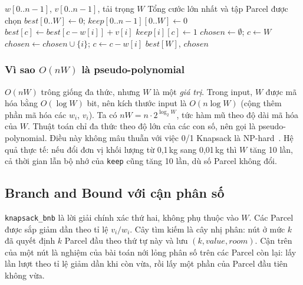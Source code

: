 \begin{algorithm}[t]
\caption{0/1 Knapsack bằng DP một chiều (\texttt{knapsack\_dp})}\label{alg:knap}
\begin{algorithmic}[1]
\Require $w[0..n-1]$, $v[0..n-1]$, tải trọng $W$
\Ensure Tổng cước lớn nhất và tập Parcel được chọn
\State $best[0..W] \gets 0$; \quad $keep[0..n-1][0..W] \gets 0$
      \State $best[c] \gets best[c - w[i]] + v[i]$
      \State $keep[i][c] \gets 1$
    \EndIf
  \EndFor
\EndFor
\State $chosen \gets \emptyset$; \quad $c \gets W$
    \State $chosen \gets chosen \cup \{i\}$; \quad $c \gets c - w[i]$
  \EndIf
\EndFor
\State \Return $best[W]$, $chosen$
\end{algorithmic}
\end{algorithm}

\subsubsection{Vì sao $O(nW)$ là pseudo-polynomial}
$O(nW)$ trông giống đa thức, nhưng $W$ là một \emph{giá trị}. Trong input, $W$ được mã hóa bằng $O(\log W)$ bit, nên kích thước input là $O(n \log W)$ (cộng thêm phần mã hóa các $w_i$, $v_i$). Ta có $nW = n \cdot 2^{\log_2 W}$, tức hàm mũ theo độ dài mã hóa của $W$. Thuật toán chỉ đa thức theo độ lớn của các con số, nên gọi là pseudo-polynomial. Điều này không mâu thuẫn với việc 0/1 Knapsack là NP-hard~\cite{clrs2022}. Hệ quả thực tế: nếu đổi đơn vị khối lượng từ 0,1\,kg sang 0,01\,kg thì $W$ tăng 10 lần, cả thời gian lẫn bộ nhớ của \texttt{keep} cũng tăng 10 lần, dù số Parcel không đổi.

\subsection{Branch and Bound với cận phân số}

\texttt{knapsack\_bnb} là lời giải chính xác thứ hai, không phụ thuộc vào $W$. Các Parcel được sắp giảm dần theo tỉ lệ $v_i / w_i$. Cây tìm kiếm là cây nhị phân: nút ở mức $k$ đã quyết định $k$ Parcel đầu theo thứ tự này và lưu $(k, \mathit{value}, \mathit{room})$. Cận trên của một nút là nghiệm của bài toán nới lỏng phân số trên các Parcel còn lại: lấy lần lượt theo tỉ lệ giảm dần khi còn vừa, rồi lấy một phần của Parcel đầu tiên không vừa.

